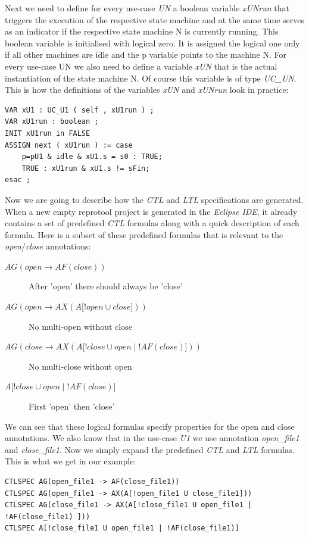 Next we need to define for every use-case \emph{UN} a boolean variable \emph{xUNrun} that triggers the execution of the respective state machine
and at the same time serves as an indicator if the respective state machine N is currently running. This boolean variable is
initialised with logical zero. It is assigned the logical one only if all other machines are idle and the p variable points to the
machine N. For every use-case UN we also need to define a variable \emph{xUN} that is the actual instantiation of the state machine N.
Of course this variable is of type \emph{UC\_UN}. This is how the definitions of the variables \emph{xUN} and \emph{xUNrun} look in practice:
\begin{lstlisting}
VAR xU1 : UC_U1 ( self , xU1run ) ;
VAR xU1run : boolean ;
INIT xU1run in FALSE
ASSIGN next ( xU1run ) := case
	p=pU1 & idle & xU1.s = s0 : TRUE;
	TRUE : xU1run & xU1.s != sFin;
esac ;
\end{lstlisting}

Now we are going to describe how the \emph{CTL} and \emph{LTL} specifications are generated. When a new empty reprotool project is generated in the
\emph{Eclipse IDE}, it already contains a set of predefined \emph{CTL} formulas along with a quick description of each formula. Here is a subset of
these predefined formulas that is relevant to the \emph{open}/\emph{close} annotations:

\begin{description}
 \item[$AG(open \rightarrow AF(close))$] After 'open' there should always be 'close'
 \item[$AG(open \rightarrow AX(A\lbrack!open \cup close\rbrack))$] No multi-open without close
 \item[$AG(close \rightarrow AX(A\lbrack!close \cup open \mid !AF(close) \rbrack))$] No multi-close without open
 \item[$A\lbrack !close \cup open \mid !AF(close)\rbrack$] First 'open' then 'close'
\end{description}

We can see that these logical formulas specify properties for the open and close annotations. We also know that in the use-case \emph{U1} we
use annotation \emph{open\_file1} and \emph{close\_file1}. Now we simply expand the predefined \emph{CTL} and \emph{LTL} formulas. This is what we get in our
example:
\begin{lstlisting}
CTLSPEC AG(open_file1 -> AF(close_file1))
CTLSPEC AG(open_file1 -> AX(A[!open_file1 U close_file1]))
CTLSPEC AG(close_file1 -> AX(A[!close_file1 U open_file1 | !AF(close_file1) ]))
CTLSPEC A[!close_file1 U open_file1 | !AF(close_file1)]
\end{lstlisting}

